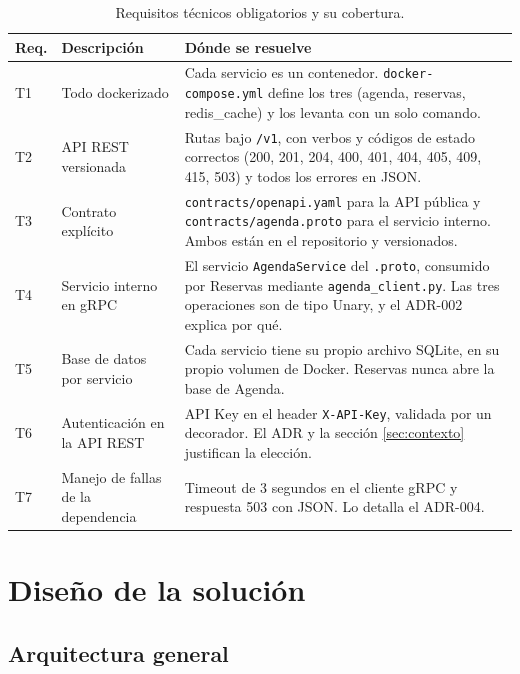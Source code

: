 \documentclass[12pt, a4paper]{article}
\begin{document}
\begin{table}[H]
\centering
\caption{Requisitos técnicos obligatorios y su cobertura.}
\begin{tabular}{@{}p{1.1cm}p{4.2cm}p{8.2cm}@{}}
\toprule
\textbf{Req.} & \textbf{Descripción} & \textbf{Dónde se resuelve} \\
\midrule
T1 & Todo dockerizado &
Cada servicio es un contenedor. \texttt{docker-compose.yml} define los
tres (agenda, reservas, redis\_cache) y los levanta con un solo comando. \\
\addlinespace
T2 & API REST versionada &
Rutas bajo \texttt{/v1}, con verbos y códigos de estado correctos
(200, 201, 204, 400, 401, 404, 405, 409, 415, 503) y todos los errores en
JSON. \\
\addlinespace
T3 & Contrato explícito &
\texttt{contracts/openapi.yaml} para la API pública y
\texttt{contracts/agenda.proto} para el servicio interno. Ambos están en
el repositorio y versionados. \\
\addlinespace
T4 & Servicio interno en gRPC &
El servicio \texttt{AgendaService} del \texttt{.proto}, consumido por
Reservas mediante \texttt{agenda\_client.py}. Las tres operaciones son de
tipo Unary, y el ADR-002 explica por qué. \\
\addlinespace
T5 & Base de datos por servicio &
Cada servicio tiene su propio archivo SQLite, en su propio volumen de
Docker. Reservas nunca abre la base de Agenda. \\
\addlinespace
T6 & Autenticación en la API REST &
API Key en el header \texttt{X-API-Key}, validada por un decorador. El
ADR y la sección \ref{sec:contexto} justifican la elección. \\
\addlinespace
T7 & Manejo de fallas de la dependencia &
Timeout de 3 segundos en el cliente gRPC y respuesta 503 con JSON. Lo
detalla el ADR-004. \\
\bottomrule
\end{tabular}
\end{table}


\newpage
\section{Diseño de la solución}\label{sec:diseno}

\subsection{Arquitectura general}
\end{document}
